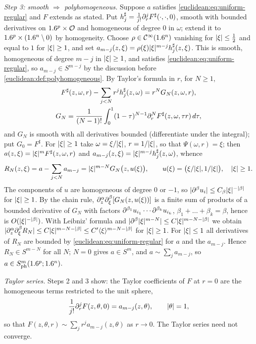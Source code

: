 \emph{Step 3: smooth $\Rightarrow$ polyhomogeneous.} Suppose $a$ satisfies
\eqref{euclidean:eq:uniform-regular} and $F$ extends as stated. Put
$h_j^\sharp=\frac1{j!}\partial^j_rF^\sharp(\cdot,\cdot,0)$, smooth with bounded derivatives on
$1.6^p\times\mathcal O$ and homogeneous of degree $0$ in $\omega$; extend it to
$1.6^p\times(1.6^n\setminus0)$ by homogeneity. Choose $\rho\in\mathcal{C}^\infty(1.6^n)$ vanishing for
$\lvert \xi\rvert\le\frac12$ and equal to $1$ for $\lvert \xi\rvert\ge1$, and set
$a_{m-j}(z,\xi)=\rho(\xi)\lvert \xi\rvert^{m-j}h_j^\sharp(z,\xi)$. This is smooth, homogeneous of
degree $m-j$ in $\lvert \xi\rvert\ge1$, and satisfies \eqref{euclidean:eq:uniform-regular}, so
$a_{m-j}\in S^{m-j}$ by the discussion before \cref{euclidean:def:polyhomogeneous}. By
Taylor's formula in $r$, for $N\ge1$,
\begin{gather*}
  F^\sharp(z,\omega,r)-\sum_{j<N}r^jh^\sharp_j(z,\omega)=r^NG_N(z,\omega,r),\\
  G_N=\frac1{(N-1)!}\int_0^1(1-\tau)^{N-1}\partial^N_rF^\sharp(z,\omega,\tau r)\,d\tau,
\end{gather*}
and $G_N$ is smooth with all derivatives bounded (differentiate under the integral); put
$G_0=F^\sharp$. For $\lvert \xi\rvert\ge1$ take $\omega=\xi/\lvert \xi\rvert$, $r=1/\lvert \xi\rvert$, so that
$\Psi(\omega,r)=\xi$; then $a(z,\xi)=\lvert \xi\rvert^mF^\sharp(z,\omega,r)$ and
$a_{m-j}(z,\xi)=\lvert \xi\rvert^{m-j}h_j^\sharp(z,\omega)$, whence
\begin{equation*}
  R_N(z,\xi)=a-\sum_{j<N}a_{m-j}=\lvert \xi\rvert^{m-N}G_N\bigl(z,u(\xi)\bigr),\qquad
  u(\xi)=\bigl(\xi/\lvert \xi\rvert,1/\lvert \xi\rvert\bigr),\quad\lvert \xi\rvert\ge1.
\end{equation*}
The components of $u$ are homogeneous of degree $0$ or $-1$, so
$\lvert \partial^\beta u_i\rvert\le C_\beta\lvert \xi\rvert^{-\lvert \beta\rvert}$ for $\lvert \xi\rvert\ge1$. By the chain rule,
$\partial^\alpha_z\partial^\beta_\xi[G_N(z,u(\xi))]$ is a finite sum of products of a bounded
derivative of $G_N$ with factors $\partial^{\beta_1}u_{i_1}\cdots\partial^{\beta_k}u_{i_k}$,
$\beta_1+\dots+\beta_k=\beta$, hence is $O(\lvert \xi\rvert^{-\lvert \beta\rvert})$. With Leibniz' formula
and $\lvert \partial^\beta\lvert \xi\rvert^{m-N}\rvert\le C\lvert \xi\rvert^{m-N-\lvert \beta\rvert}$ we obtain
$\lvert \partial^\alpha_z\partial^\beta_\xi R_N\rvert\le C\lvert \xi\rvert^{m-N-\lvert \beta\rvert}\le C'\langle \xi\rangle^{m-N-\lvert \beta\rvert}$
for $\lvert \xi\rvert\ge1$. For $\lvert \xi\rvert\le1$ all derivatives of $R_N$ are bounded by
\eqref{euclidean:eq:uniform-regular} for $a$ and the $a_{m-j}$. Hence
$R_N\in S^{m-N}$ for all $N$; $N=0$ gives $a\in S^m$, and $a\sim\sum_ja_{m-j}$, so
$a\in S^{m}_{\mathrm{ph}}(1.6^p;1.6^n)$.

\emph{Taylor series.} Steps 2 and 3 show: the Taylor coefficients of $F$ at $r=0$ are the
homogeneous terms restricted to the unit sphere,
\begin{equation*}
  \frac1{j!}\partial^j_rF(z,\theta,0)=a_{m-j}(z,\theta),\qquad\lvert \theta\rvert=1,
\end{equation*}
so that $F(z,\theta,r)\sim\sum_jr^ja_{m-j}(z,\theta)$ as $r\to0$. The Taylor series need not
converge.

